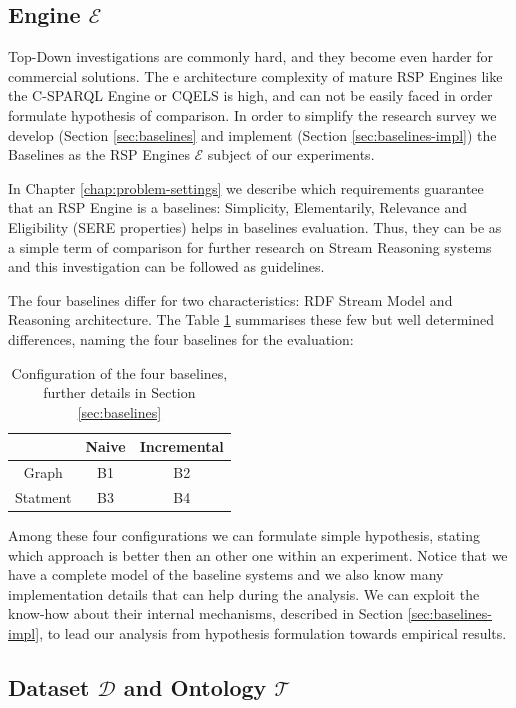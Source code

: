 \subsection{Engine $\mathcal{E}$}

Top-Down investigations are commonly hard, and they become even harder for commercial solutions. The e architecture complexity of mature RSP Engines like the C-SPARQL Engine or CQELS is high, and can not be easily faced in order formulate hypothesis of comparison. In order to simplify the research survey we develop (Section \ref{sec:baselines} and implement (Section \ref{sec:baselines-impl}) the Baselines as the RSP Engines $\mathcal{E}$ subject of our experiments. 

In Chapter \ref{chap:problem-settings} we describe which requirements guarantee that an RSP Engine is a baselines: Simplicity, Elementarily, Relevance and Eligibility (SERE properties) helps in baselines evaluation. Thus, they can be as a simple term of comparison for further research on Stream Reasoning systems and this investigation can be followed as guidelines.
 
The four baselines differ for two characteristics: RDF Stream Model and Reasoning architecture. The Table \ref{tab:baselines-names} summarises these few but well determined differences, naming the four baselines for the evaluation:\begin{table}[htb]
\scriptsize
\centering
\begin{tabular}{c|cc} %
	\hline
         & Naive & Incremental\\
	\hline
	Graph        &  B1      & B2\\
	Statment   &  B3   & B4\\
	\hline %
\end{tabular}
\caption{Configuration of the four baselines, further details in Section \ref{sec:baselines}}
\label{tab:baselines-names}
\end{table}

\noindent Among these four configurations we can formulate simple hypothesis, stating which approach is better then an other one within an experiment. Notice that we have a complete model of the baseline systems and we also know many implementation details that can help during the analysis. We can exploit the know-how about their internal mechanisms, described in Section \ref{sec:baselines-impl}, to lead our analysis from hypothesis formulation towards empirical results. 

\subsection{Dataset $\mathcal{D}$ and Ontology $\mathcal{T}$}\label{sec:dataset}

